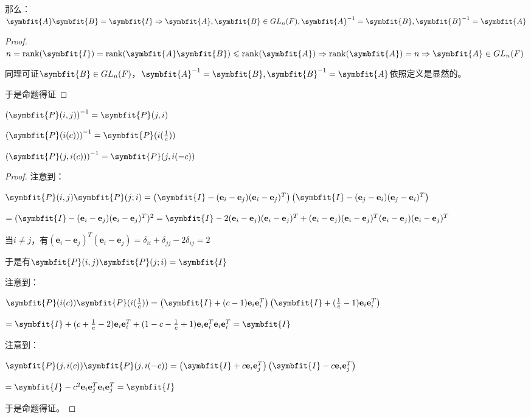 \documentclass[12pt, a4paper, oneside, UTF8]{ctexbook}
\begin{document}
\begin{para}{0}
\begin{proposition}
						那么：$\symbfit{A}\symbfit{B}=\symbfit{I} \Rightarrow \symbfit{A},\symbfit{B} \in GL_n(F),\symbfit{A}^{-1}=\symbfit{B},\symbfit{B}^{-1}=\symbfit{A}$
					\end{proposition}
					\begin{proof}
						$n=\rank(\symbfit{I})=\rank(\symbfit{A}\symbfit{B})\leqslant \rank(\symbfit{A}) \Rightarrow \rank(\symbfit{A})=n \Rightarrow \symbfit{A} \in GL_n(F)$

						同理可证$\symbfit{B} \in GL_n(F)$，$\symbfit{A}^{-1}=\symbfit{B},\symbfit{B}^{-1}=\symbfit{A}$依照定义是显然的。

						于是命题得证
					\end{proof}
				\point{}
					\begin{proposition}
						$\left(\symbfit{P}(i,j)\right)^{-1}=\symbfit{P}(j,i)$

						$\left(\symbfit{P}(i(c))\right)^{-1}=\symbfit{P}(i(\frac{1}{c}))$

						$\left(\symbfit{P}(j,i(c))\right)^{-1}=\symbfit{P}(j,i(-c))$
					\end{proposition}
					\begin{proof}
						注意到：
						
						$\symbfit{P}(i,j)\symbfit{P}(j;i)=\left(\symbfit{I}-(\mathbf{e}_i-\mathbf{e}_j)(\mathbf{e}_i-\mathbf{e}_j)^T\right)\left(\symbfit{I}-(\mathbf{e}_j-\mathbf{e}_i)(\mathbf{e}_j-\mathbf{e}_i)^T\right)$
					
						$=(\symbfit{I}-(\mathbf{e}_i-\mathbf{e}_j)(\mathbf{e}_i-\mathbf{e}_j)^T)^2=\symbfit{I}-2(\mathbf{e}_i-\mathbf{e}_j)(\mathbf{e}_i-\mathbf{e}_j)^T+(\mathbf{e}_i-\mathbf{e}_j)(\mathbf{e}_i-\mathbf{e}_j)^T(\mathbf{e}_i-\mathbf{e}_j)(\mathbf{e}_i-\mathbf{e}_j)^T$

						当$i\neq j$，有$(\mathbf{e}_i-\mathbf{e}_j)^T(\mathbf{e}_i-\mathbf{e}_j)=\delta_{ii}+\delta_{jj}-2\delta_{ij}=2$

						于是有$\symbfit{P}(i,j)\symbfit{P}(j;i)=\symbfit{I}$

						注意到：

						$\symbfit{P}(i(c))\symbfit{P}(i(\frac{1}{c}))=\left(\symbfit{I}+(c-1)\mathbf{e}_i \mathbf{e}_i^T\right)\left(\symbfit{I}+(\frac{1}{c}-1)\mathbf{e}_i \mathbf{e}_i^T\right)$

						$=\symbfit{I}+(c+\frac{1}{c}-2)\mathbf{e}_i \mathbf{e}_i^T+(1-c-\frac{1}{c}+1)\mathbf{e}_i \mathbf{e}_i^T\mathbf{e}_i \mathbf{e}_i^T=\symbfit{I}$

						注意到：

						$\symbfit{P}(j,i(c))\symbfit{P}(j,i(-c))=\left(\symbfit{I}+c\mathbf{e}_i \mathbf{e}_j^T\right)\left(\symbfit{I}-c\mathbf{e}_i \mathbf{e}_j^T\right)$
					
						$=\symbfit{I}-c^2\mathbf{e}_i \mathbf{e}_j^T\mathbf{e}_i \mathbf{e}_j^T=\symbfit{I}$

						于是命题得证。
					\end{proof}
			\end{para}
\end{document}
